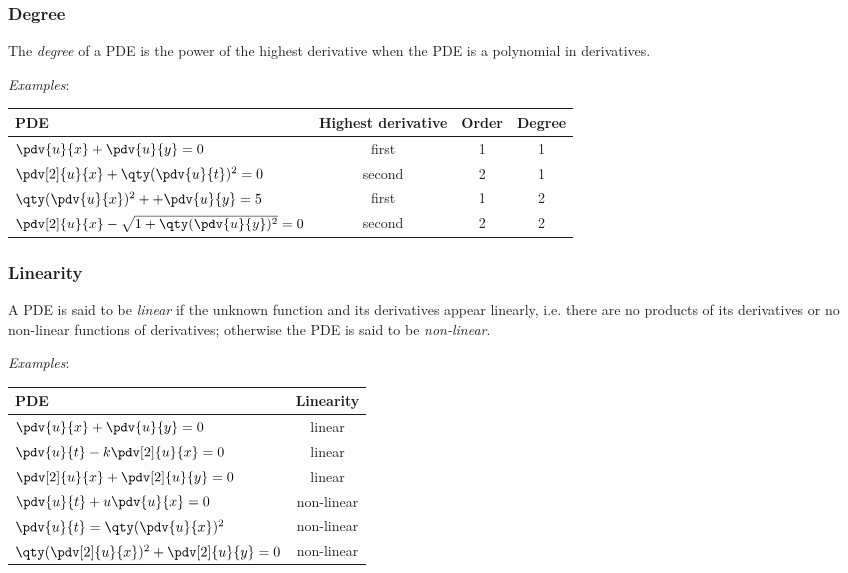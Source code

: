         \subsubsection{Degree}
            The \textit{degree} of a PDE is the power of the highest derivative when the PDE is a polynomial in derivatives.

            \textit{Examples}:
            \renewcommand{\arraystretch}{2.2}
            \begin{table}[h!]
                \centering
                \begin{tabular}{p{}ccc}
                    \toprule[1.5pt]
                    \textbf{PDE} & \textbf{Highest derivative} & \textbf{Order} & \textbf{Degree} \\ \midrule[1.5pt]
                    {$\pdv{u}{x}+\pdv{u}{y}=0$} & {first} & {1} & {1} \\ %
                    {$\pdv[2]{u}{x}+\qty(\pdv{u}{t})^2=0$} & {second} & {2} & {1} \\ %
                    {$\qty(\pdv{u}{x})^2++\pdv{u}{y}=5$} & {first} & {1} & {2} \\ %
                    {$\pdv[2]{u}{x}-\sqrt{1+\qty(\pdv{u}{y})^2}=0$} & {second} & {2} & {2} \\
                    \bottomrule[1.5pt]
                \end{tabular}
            \end{table}

        \subsubsection{Linearity}
            A PDE is said to be \textit{linear} if the unknown function and its derivatives appear linearly, i.e. there are no products of its derivatives or no non-linear functions of derivatives; otherwise the PDE is said to be \textit{non-linear}.

            \textit{Examples}:
            \renewcommand{\arraystretch}{2.2}
            \begin{table}[h!]
                \centering
                \begin{tabular}{p{}c}
                    \toprule[1.5pt]
                    \textbf{PDE} & \textbf{Linearity} \\ \midrule[1.5pt]
                    {$\pdv{u}{x}+\pdv{u}{y}=0$} & {linear} \\ %
                    {$\pdv{u}{t}-k\pdv[2]{u}{x}=0$} & {linear} \\ %
                    {$\pdv[2]{u}{x}+\pdv[2]{u}{y}=0$} & {linear} \\ %
                    {$\pdv{u}{t}+u\pdv{u}{x}=0$} & {non-linear} \\ %
                    {$\pdv{u}{t}=\qty(\pdv{u}{x})^2$} & {non-linear} \\
                    {$\qty(\pdv[2]{u}{x})^2+\pdv[2]{u}{y}=0$} & {non-linear} \\
                    \bottomrule[1.5pt]
                \end{tabular}
            \end{table}

